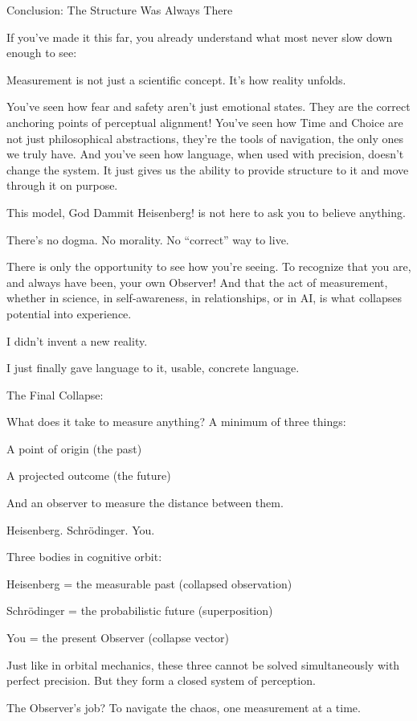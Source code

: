 \documentclass[12pt]{article}
\begin{document}
Conclusion: The Structure Was Always There 

If you’ve made it this far, you already understand what most never slow down enough to see:

Measurement is not just a scientific concept.
It’s how reality unfolds.

You’ve seen how fear and safety aren’t just emotional states. They are the correct anchoring points of perceptual alignment!
You’ve seen how Time and Choice are not just philosophical abstractions, they’re the tools of navigation, the only ones we truly have.
And you’ve seen how language, when used with precision, doesn’t change the system.
It just gives us the ability to provide structure to it and move through it on purpose.

This model, God Dammit Heisenberg! is not here to ask you to believe anything.

There’s no dogma.
No morality.
No “correct” way to live.

There is only the opportunity to see how you're seeing.
To recognize that you are, and always have been, your own Observer!
And that the act of measurement, whether in science, in self-awareness, in relationships, or in AI, is what collapses potential into experience.

I didn’t invent a new reality.

I just finally gave language to it, usable, concrete language.

The Final Collapse:

What does it take to measure anything? A minimum of three things:

A point of origin (the past)

A projected outcome (the future)

And an observer to measure the distance between them.

Heisenberg. Schrödinger. You.

Three bodies in cognitive orbit:

Heisenberg = the measurable past (collapsed observation)

Schrödinger = the probabilistic future (superposition)

You = the present Observer (collapse vector)

Just like in orbital mechanics, these three cannot be solved simultaneously with perfect precision. But they form a closed system of perception.

The Observer’s job?
To navigate the chaos, one measurement at a time.
\end{document}
